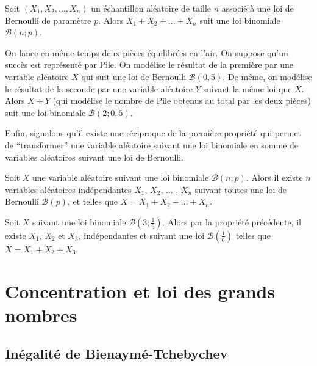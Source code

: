 	\begin{formula}
		Soit $(X_1, X_2, \dots, X_n)$ un échantillon aléatoire de taille $n$ associé à une loi de Bernoulli de paramètre $p$.
		\newpar
		Alors $X_1 + X_2 + \dots + X_n$ suit une loi binomiale $\mathcal{B}(n; p)$.
	\end{formula}
	
	\begin{tip}[Exemple]
		On lance en même temps deux pièces équilibrées en l'air. On suppose qu'un succès est représenté par Pile.
		\newpar
		On modélise le résultat de la première par une variable aléatoire $X$ qui suit une loi de Bernoulli $\mathcal{B}(0,5)$. De même, on modélise le résultat de la seconde par une variable aléatoire $Y$ suivant la même loi que $X$.
		\newpar
		Alors $X + Y$ (qui modélise le nombre de Pile obtenus au total par les deux pièces) suit une loi binomiale $\mathcal{B}(2; 0,5)$.
	\end{tip}
	
	Enfin, signalons qu'il existe une réciproque de la première propriété qui permet de ``transformer'' une variable aléatoire suivant une loi binomiale en somme de variables aléatoires suivant une loi de Bernoulli.
	
	\begin{formula}
		Soit $X$ une variable aléatoire suivant une loi binomiale $\mathcal{B}(n; p)$.
		\newpar
		Alors il existe $n$ variables aléatoires indépendantes $X_1$, $X_2$, ... , $X_n$ suivant toutes une loi de Bernoulli $\mathcal{B}(p)$, et telles que $X = X_1 + X_2 + \dots + X_n$.
	\end{formula}
	
	\begin{tip}[Exemple]
		Soit $X$ suivant une loi binomiale $\mathcal{B}\left(3; \frac{1}{6}\right)$. Alors par la propriété précédente, il existe $X_1$, $X_2$ et $X_3$, indépendantes et suivant une loi $\mathcal{B}\left(\frac{1}{6}\right)$ telles que $X = X_1 + X_2 + X_3$.
	\end{tip}
	
	\section{Concentration et loi des grands nombres}
	
	\subsection{Inégalité de Bienaymé-Tchebychev}
	
